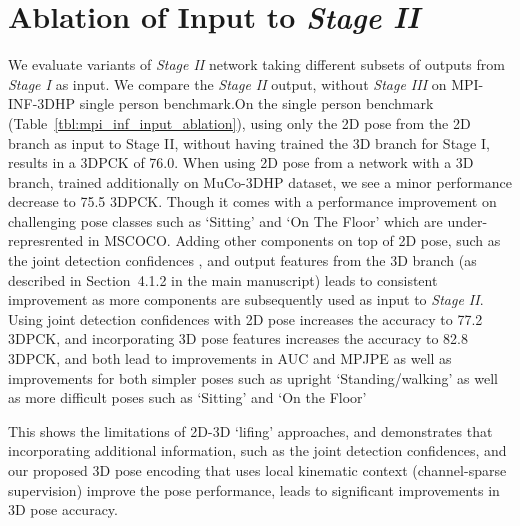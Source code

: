 \documentclass[acmtog,authorversion]{acmart}
\begin{document}
\section{Ablation of Input to \textit{Stage II}}
\label{sec:ablation}
We evaluate variants of \textit{Stage II} network taking different subsets of outputs from \textit{Stage I} as input. We compare the \textit{Stage II} output, without \textit{Stage III} on MPI-INF-3DHP 
single person benchmark.On the single person benchmark (Table~\ref{tbl:mpi_inf_input_ablation}), using only the 2D pose from the 2D branch as input to Stage II, without having trained the 3D branch for Stage I, results in a 3DPCK of 76.0. When using 2D pose from a network with a 3D branch, trained additionally on MuCo-3DHP dataset, we see a minor performance decrease to 75.5 3DPCK. Though it comes with a performance improvement on challenging pose classes such as `Sitting' and `On The Floor' which are under-represrented in MSCOCO. 
Adding other components on top of 2D pose, such as the joint detection confidences , and output features from the 3D branch  (as described in Section~4.1.2 in the main manuscript) leads to consistent improvement as more components are subsequently used as input to \textit{Stage II}. Using joint detection confidences  with 2D pose increases the accuracy to 77.2 3DPCK, and incorporating 3D pose features  increases the accuracy to 82.8 3DPCK, and both lead to improvements in AUC and MPJPE as well as improvements for both simpler poses such as upright `Standing/walking' as well as more difficult poses such as `Sitting' and `On the Floor'

This shows the limitations of 2D-3D `lifing' approaches, and demonstrates that incorporating additional information, such as the joint detection confidences, and our proposed 3D pose encoding that uses local kinematic context (channel-sparse supervision) improve the pose performance, leads to significant improvements in 3D pose accuracy. 
\end{document}
